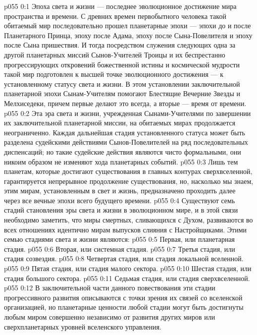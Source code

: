 \author{Могучий Вестник}
\vs p055 0:1 Эпоха света и жизни --- последнее эволюционное достижение мира пространства и времени. С древних времен первобытного человека такой обитаемый мир последовательно прошел планетарные эпохи --- эпохи до и после Планетарного Принца, эпоху после Адама, эпоху после Сына\hyp{}Повелителя и эпоху после Сына пришествия. И тогда посредством служения следующих одна за другой планетарных миссий Сынов\hyp{}Учителей Троицы и их беспрестанно прогрессирующих откровений божественной истины и космической мудрости такой мир подготовлен к высшей точке эволюционного достижения --- к установленному статусу света и жизни. В этом установлении заключительной планетарной эпохи Сынам\hyp{}Учителям помогают Блестящие Вечерние Звезды и Мелхиседеки, причем первые делают это всегда, а вторые --- время от времени.
\vs p055 0:2 Эта эра света и жизни, учрежденная Сынами\hyp{}Учителями по завершении их заключительной планетарной миссии, на обитаемых мирах продолжается неограниченно. Каждая дальнейшая стадия установленного статуса может быть разделена судейскими действиями Сынов\hyp{}Повелителей на ряд последовательных диспенсаций; но такие судейские действия являются чисто формальными, они никоим образом не изменяют хода планетарных событий.
\vs p055 0:3 \pc Лишь тем планетам, которые достигают существования в главных контурах сверхвселенной, гарантируется непрерывное продолжение существования, но, насколько мы знаем, этим мирам, установленным в свет и жизнь, предназначено проходить далее через все вечные эпохи всего будущего времени.
\vs p055 0:4 \pc Существуют семь стадий становления эры света и жизни в эволюционном мире, и в этой связи необходимо заметить, что миры смертных, сливающихся с Духом, развиваются во всех отношениях идентично мирам выпусков слияния с Настройщиками. Этими семью стадиями света и жизни являются:
\vs p055 0:5 \bibnobreakspace Первая, или планетарная стадия.
\vs p055 0:6 \bibnobreakspace Вторая, или системная стадия.
\vs p055 0:7 \bibnobreakspace Третья стадия, или стадия созвездия.
\vs p055 0:8 \bibnobreakspace Четвертая стадия, или стадия локальной вселенной.
\vs p055 0:9 \bibnobreakspace Пятая стадия, или стадия малого сектора.
\vs p055 0:10 \bibnobreakspace Шестая стадия, или стадия большого сектора.
\vs p055 0:11 \bibnobreakspace Седьмая стадия, или стадия сверхвселенной.
\vs p055 0:12 \pc В заключительной части данного повествования эти стадии прогрессивного развития описываются с точки зрения их связей со вселенской организацией, но планетарные ценности любой стадии могут быть достигнуты любым миром совершенно независимо от развития других миров или сверхпланетарных уровней вселенского управления.
